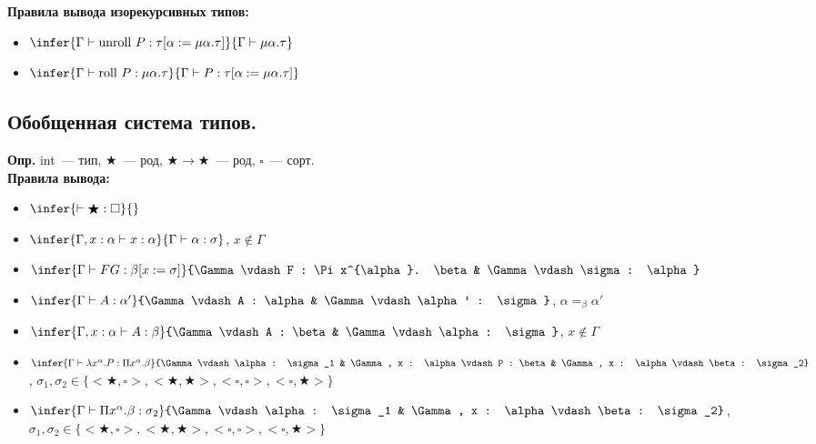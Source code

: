 \documentclass{article}
\begin{document}
	\textbf{Правила вывода изорекурсивных типов:}
	\begin{itemize}
		\item $\infer{\Gamma \vdash \text{unroll } P : \tau [\alpha := \mu \alpha. \tau]}{\Gamma \vdash \mu \alpha. \tau}$
		\item $\infer{\Gamma \vdash \text{roll } P : \mu \alpha. \tau}{\Gamma \vdash P : \tau [\alpha := \mu \alpha. \tau]}$
	\end{itemize}
	\subsection{Обобщенная система типов.}
	\textbf{Опр.} int~--- тип, $\bigstar$~--- род, $\bigstar \rightarrow \bigstar$~--- род, $\square$~--- сорт. \\
	\textbf{Правила вывода:}
	\begin{itemize}
		\item $\infer{\vdash \bigstar : \square}{}$
		\item $\infer{\Gamma, x : \alpha \vdash x : \alpha}{\Gamma \vdash \alpha : \sigma}$, $x \not\in \Gamma$
		\item $\infer{\Gamma \vdash FG : \beta [x := \sigma]}{\Gamma \vdash F : \Pi x^{\alpha}. \beta & \Gamma \vdash \sigma : \alpha}$
		\item $\infer{\Gamma \vdash A : \alpha'}{\Gamma \vdash A : \alpha & \Gamma \vdash \alpha' : \sigma}$, $\alpha =_{\beta} \alpha'$
		\item $\infer{\Gamma, x : \alpha \vdash A : \beta}{\Gamma \vdash A : \beta & \Gamma \vdash \alpha : \sigma}$, $x \not\in \Gamma$
		\item $\infer{\Gamma \vdash \lambda x^{\alpha}. P : \Pi x^{\alpha}. \beta}{\Gamma \vdash \alpha : \sigma_1 & \Gamma, x : \alpha \vdash P : \beta & \Gamma, x : \alpha \vdash \beta : \sigma_2}$, $\sigma_1, \sigma_2 \in \{ <\bigstar, \square>, <\bigstar, \bigstar>, <\square, \square>, <\square, \bigstar> \}$
		\item $\infer{\Gamma \vdash \Pi x^{\alpha}. \beta : \sigma_2}{\Gamma \vdash \alpha : \sigma_1 & \Gamma, x : \alpha \vdash \beta : \sigma_2}$, $\sigma_1, \sigma_2 \in \{ <\bigstar, \square>, <\bigstar, \bigstar>, <\square, \square>, <\square, \bigstar> \}$
	\end{itemize}
\end{document}
